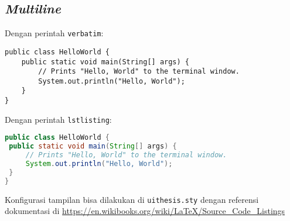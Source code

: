 \subsection{\textit{Multiline}}

Dengan perintah \verb|verbatim|: 

\begin{verbatim}	
public class HelloWorld {
    public static void main(String[] args) {
        // Prints "Hello, World" to the terminal window.
        System.out.println("Hello, World");
    }
}
\end{verbatim}

Dengan perintah \verb|lstlisting|:

\begin{lstlisting}[language=Java]
public class HelloWorld {
 public static void main(String[] args) {
     // Prints "Hello, World" to the terminal window.
     System.out.println("Hello, World");
 }
}
\end{lstlisting}

Konfigurasi tampilan bisa dilakukan di \verb|uithesis.sty| dengan referensi dokumentasi di \url{https://en.wikibooks.org/wiki/LaTeX/Source_Code_Listings}